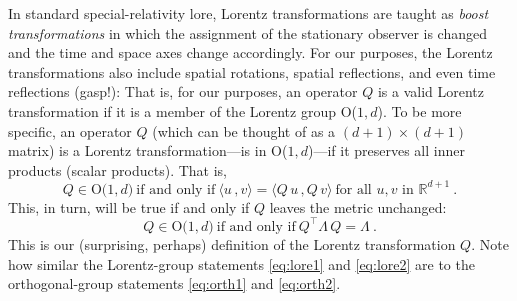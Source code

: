 \documentclass{article}
\newcommand{\inner}[2]{\langle{#1}\,,{#2}\rangle}
\begin{document}
In standard special-relativity lore, Lorentz transformations are taught as \emph{boost transformations} in which the assignment of the stationary observer is changed and the time and space axes change accordingly.
For our purposes, the Lorentz transformations also include spatial rotations, spatial reflections, and even time reflections (gasp!):
That is, for our purposes, an operator $Q$ is a valid Lorentz transformation if it is a member of the Lorentz group O($1,d$).
To be more specific, an operator $Q$ (which can be thought of as a $(d+1)\times(d+1)$ matrix) is a Lorentz transformation---is in O($1,d$)---if it preserves all inner products (scalar products). 
That is,
\begin{equation}
    Q \in \mbox{O($1,d$)} ~ \mbox{if and only if} ~ \inner{u}{v}=\inner{Q\,u}{Q\,v} ~ \mbox{for all $u,v$ in $\mathbb{R}^{d+1}$} ~ .\label{eq:lore1}
\end{equation}
This, in turn, will be true if and only if $Q$ leaves the metric unchanged:
\begin{equation}
    Q \in \mbox{O($1,d$)} ~ \mbox{if and only if} ~ Q^\top\Lambda\,Q=\Lambda ~ .\label{eq:lore2}
\end{equation}
This is our (surprising, perhaps) definition of the Lorentz transformation $Q$.
Note how similar the Lorentz-group statements \eqref{eq:lore1} and \eqref{eq:lore2} are to the orthogonal-group statements \eqref{eq:orth1} and \eqref{eq:orth2}.
\end{document}
